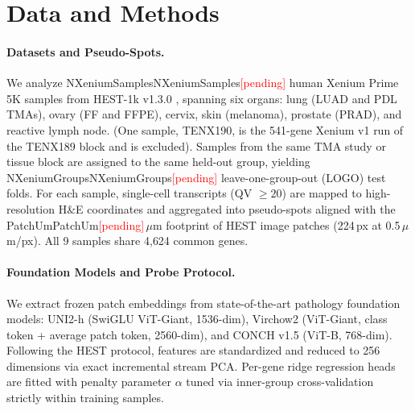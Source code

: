 \documentclass[10pt,twocolumn]{article}
\providecommand{\pending}{\textcolor{red}{[pending]}}
\newcommand{\num}[1]{\ifcsname #1\endcsname\csname #1\endcsname\else\pending\fi}
\begin{document}
\section{Data and Methods}
\label{sec:methods}

\paragraph{Datasets and Pseudo-Spots.}
We analyze \num{NXeniumSamples} human Xenium Prime 5K samples from HEST-1k v1.3.0 \citep{jaume2024hest}, spanning six organs: lung (LUAD and PDL TMAs), ovary (FF and FFPE), cervix, skin (melanoma), prostate (PRAD), and reactive lymph node. (One sample, TENX190, is the 541-gene Xenium v1 run of the TENX189 block and is excluded). Samples from the same TMA study or tissue block are assigned to the same held-out group, yielding \num{NXeniumGroups} leave-one-group-out (LOGO) test folds. For each sample, single-cell transcripts (QV $\ge 20$) are mapped to high-resolution H\&E coordinates and aggregated into pseudo-spots aligned with the \num{PatchUm}\,$\mu$m footprint of HEST image patches (224\,px at 0.5\,$\mu$m/px). All 9 samples share 4{,}624 common genes.

\paragraph{Foundation Models and Probe Protocol.}
We extract frozen patch embeddings from state-of-the-art pathology foundation models: UNI2-h (SwiGLU ViT-Giant, 1536-dim), Virchow2 (ViT-Giant, class token + average patch token, 2560-dim), and CONCH v1.5 (ViT-B, 768-dim). Following the HEST protocol, features are standardized and reduced to 256 dimensions via exact incremental stream PCA. Per-gene ridge regression heads are fitted with penalty parameter $\alpha$ tuned via inner-group cross-validation strictly within training samples.
\end{document}
